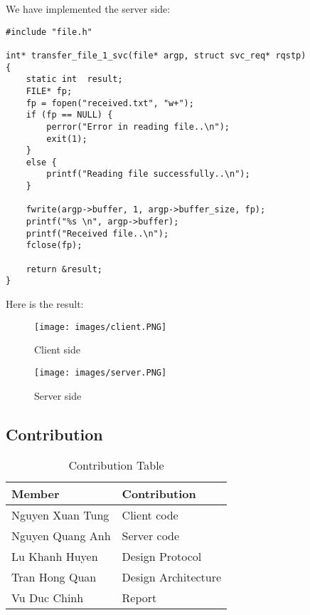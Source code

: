 \documentclass[13pt]{article}
\begin{document}
\noindent%
We have implemented the server side: 
\begin{verbatim}
#include "file.h"

int* transfer_file_1_svc(file* argp, struct svc_req* rqstp)
{
	static int  result;
	FILE* fp;
	fp = fopen("received.txt", "w+");
	if (fp == NULL) {
		perror("Error in reading file..\n");
		exit(1);
	}
	else {
		printf("Reading file successfully..\n");
	}

	fwrite(argp->buffer, 1, argp->buffer_size, fp);
	printf("%s \n", argp->buffer);
	printf("Received file..\n");
	fclose(fp);

	return &result;
}
\end{verbatim}
\noindent%
Here is the result:
\begin{figure}[H]
    \centering
    \texttt{[image: images/client.PNG]}
    \caption{Client side}
\end{figure}

\begin{figure}[H]
    \centering
    \texttt{[image: images/server.PNG]}
    \caption{Server side}
\end{figure}
\subsection{Contribution}
\noindent%
\begin{table}[ht!]
  \begin{center}
    \label{tab:table1}
    \begin{tabular}{l|l}
      \textbf{Member} & \textbf{Contribution}\\
      \hline
      Nguyen Xuan Tung & Client code\\
      Nguyen Quang Anh & Server code\\
      Lu Khanh Huyen & Design Protocol\\
      Tran Hong Quan & Design Architecture\\
      Vu Duc Chinh & Report\\
    \end{tabular}
    \caption{Contribution Table}
  \end{center}
\end{table}
\end{document}
